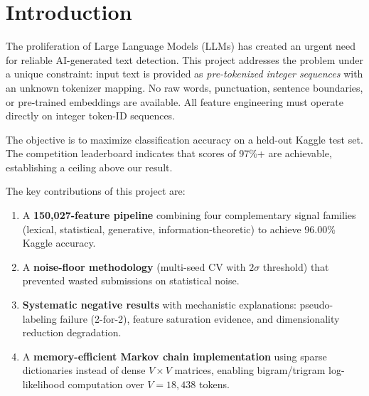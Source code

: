 \documentclass[11pt]{article}
\begin{document}
\section{Introduction}

The proliferation of Large Language Models (LLMs) has created an urgent need for reliable AI-generated text detection. This project addresses the problem under a unique constraint: input text is provided as \textit{pre-tokenized integer sequences} with an unknown tokenizer mapping. No raw words, punctuation, sentence boundaries, or pre-trained embeddings are available. All feature engineering must operate directly on integer token-ID sequences.

The objective is to maximize classification accuracy on a held-out Kaggle test set. The competition leaderboard indicates that scores of 97\%+ are achievable, establishing a ceiling above our result.

The key contributions of this project are:
\begin{enumerate}
    \item A \textbf{150,027-feature pipeline} combining four complementary signal families (lexical, statistical, generative, information-theoretic) to achieve 96.00\% Kaggle accuracy.
    \item A \textbf{noise-floor methodology} (multi-seed CV with $2\sigma$ threshold) that prevented wasted submissions on statistical noise.
    \item \textbf{Systematic negative results} with mechanistic explanations: pseudo-labeling failure (2-for-2), feature saturation evidence, and dimensionality reduction degradation.
    \item A \textbf{memory-efficient Markov chain implementation} using sparse dictionaries instead of dense $V{\times}V$ matrices, enabling bigram/trigram log-likelihood computation over $V{=}18{,}438$ tokens.
\end{enumerate}

\end{document}
